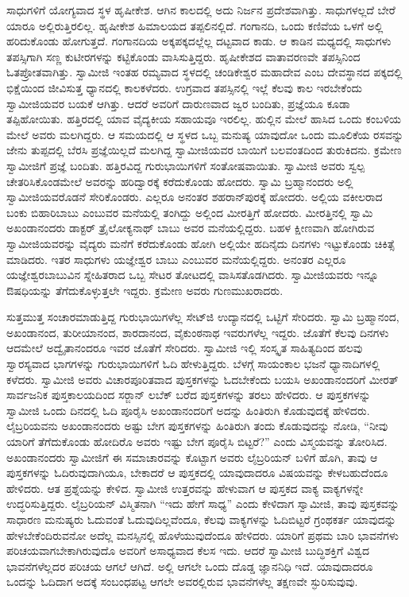 ಸಾಧುಗಳಿಗೆ ಯೋಗ್ಯವಾದ ಸ್ಥಳ ಹೃಷೀಕೇಶ. ಆಗಿನ ಕಾಲದಲ್ಲಿ ಅದು ನಿರ್ಜನ ಪ್ರದೇಶವಾಗಿತ್ತು. ಸಾಧುಗಳಲ್ಲದೆ ಬೇರೆ ಯಾರೂ ಅಲ್ಲಿರುತ್ತಿರಲಿಲ್ಲ. ಹೃಷೀಕೇಶ ಹಿಮಾಲಯದ ತಪ್ಪಲಿನಲ್ಲಿದೆ. ಗಂಗಾನದಿ, ಒಂದು ಕಣಿವೆಯ ಒಳಗೆ ಅಲ್ಲಿ ಹರಿದುಕೊಂಡು ಹೋಗುತ್ತದೆ. ಗಂಗಾನದಿಯ ಅಕ್ಕಪಕ್ಕದಲ್ಲೆಲ್ಲ ದಟ್ಟವಾದ ಕಾಡು. ಆ ಕಾಡಿನ ಮಧ್ಯದಲ್ಲಿ ಸಾಧುಗಳು ತಪಸ್ಸಿಗಾಗಿ ಸಣ್ಣ ಕುಟೀರಗಳನ್ನು ಕಟ್ಟಿಕೊಂಡು ವಾಸಿಸುತ್ತಿದ್ದರು. ಹೃಷೀಕೇಶದ ವಾತಾವರಣವೇ ತಪಸ್ಸಿನಿಂದ ಓತಪ್ರೋತವಾಗಿತ್ತು. ಸ್ವಾಮೀಜಿ ಇಂತಹ ರಮ್ಯವಾದ ಸ್ಥಳದಲ್ಲಿ ಚಂಡಿಕೇಶ್ವರ ಮಹಾದೇವ ಎಂಬ ದೇವಸ್ಥಾನದ ಪಕ್ಕದಲ್ಲಿ ಭಿಕ್ಷೆಯಿಂದ ಜೀವಿಸುತ್ತ ಧ್ಯಾನದಲ್ಲಿ ಕಾಲಕಳೆದರು. ಉಗ್ರವಾದ ತಪಸ್ಸಿನಲ್ಲಿ ಇಲ್ಲೆ ಕೆಲವು ಕಾಲ ಇರಬೇಕೆಂದು ಸ್ವಾಮೀಜಿಯವರ ಬಯಕೆ ಆಗಿತ್ತು. ಆದರೆ ಅವರಿಗೆ ದಾರುಣವಾದ ಜ್ವರ ಬಂದಿತು, ಪ್ರಜ್ಞೆಯೂ ಕೂಡಾ ತಪ್ಪಿಹೋಯಿತು. ಹತ್ತಿರದಲ್ಲಿ ಯಾವ ವೈದ್ಯಕೀಯ ಸಹಾಯವೂ ಇರಲಿಲ್ಲ. ಹುಲ್ಲಿನ ಮೇಲೆ ಹಾಸಿದ ಒಂದು ಕಂಬಳಿಯ ಮೇಲೆ ಅವರು ಮಲಗಿದ್ದರು. ಆ ಸಮಯದಲ್ಲಿ ಆ ಸ್ಥಳದ ಒಬ್ಬ ಮನುಷ್ಯ ಯಾವುದೋ ಒಂದು ಮೂಲಿಕೆಯ ರಸವನ್ನು ಜೇನು ತುಪ್ಪದಲ್ಲಿ ಬೆರಸಿ ಪ್ರಜ್ಞೆಯಿಲ್ಲದೆ ಮಲಗಿದ್ದ ಸ್ವಾಮೀಜಿಯವರ ಬಾಯಿಗೆ ಬಲವಂತದಿಂದ ತುರುಕಿದನು. ಕ್ರಮೇಣ ಸ್ವಾಮೀಜಿಗೆ ಪ್ರಜ್ಞೆ ಬಂದಿತು. ಹತ್ತಿರವಿದ್ದ ಗುರುಭಾಯಿಗಳಿಗೆ ಸಂತೋಷವಾಯಿತು. ಸ್ವಾಮೀಜಿ ಅವರು ಸ್ವಲ್ಪ ಚೇತರಿಸಿಕೊಂಡಮೇಲೆ ಅವರನ್ನು ಹರಿದ್ವಾರಕ್ಕೆ ಕರೆದುಕೊಂಡು ಹೋದರು. ಸ್ವಾಮಿ ಬ್ರಹ್ಮಾನಂದರು ಅಲ್ಲಿ ಸ್ವಾಮೀಜಿಯವರೊಡನೆ ಸೇರಿಕೊಂಡರು. ಎಲ್ಲರೂ ಅನಂತರ ಶಹರಾನ್‍ಪುರಕ್ಕೆ ಹೋದರು. ಅಲ್ಲಿಯ ವಕೀಲರಾದ ಬಂಕು ಬಿಹಾರಿಬಾಬು ಎಂಬುವರ ಮನೆಯಲ್ಲಿ ತಂಗಿದ್ದು ಅಲ್ಲಿಂದ ಮೀರತ್ತಿಗೆ ಹೋದರು. ಮೀರತ್ತಿನಲ್ಲಿ ಸ್ವಾಮಿ ಅಖಂಡಾನಂದರು ಡಾಕ್ಟರ್ ತ್ರೈಲೋಕ್ಯನಾಥ್ ಬಾಬು ಅವರ ಮನೆಯಲ್ಲಿದ್ದರು. ಬಹಳ ಕ್ಷೀಣವಾಗಿ ಹೋಗಿರುವ ಸ್ವಾಮೀಜಿಯವರನ್ನು ವೈದ್ಯರು ಮನೆಗೆ ಕರೆದುಕೊಂಡು ಹೋಗಿ ಅಲ್ಲಿಯೇ ಹದಿನೈದು ದಿನಗಳು ಇಟ್ಟುಕೊಂಡು ಚಿಕಿತ್ಸೆ ಮಾಡಿದರು. ಇತರ ಸಾಧುಗಳು ಯಜ್ಞೇಶ್ವರ ಬಾಬು ಎಂಬುವರ ಮನೆಯಲ್ಲಿದ್ದರು. ಅನಂತರ ಎಲ್ಲರೂ ಯಜ್ಞೇಶ್ವರಬಾಬುವಿನ ಸ್ನೇಹಿತರಾದ ಒಬ್ಬ ಸೇಟರ ತೋಟದಲ್ಲಿ ವಾಸಿಸತೊಡಗಿದರು. ಸ್ವಾಮೀಜಿಯವರು ಇನ್ನೂ ಔಷಧಿಯನ್ನು ತೆಗೆದುಕೊಳ್ಳುತ್ತಲೇ ಇದ್ದರು. ಕ್ರಮೇಣ ಅವರು ಗುಣಮುಖರಾದರು. 

ಸುತ್ತಮುತ್ತ ಸಂಚಾರಮಾಡುತ್ತಿದ್ದ ಗುರುಭಾಯಿಗಳೆಲ್ಲ ಸೇಟ್‍ಜಿ ಉದ್ಯಾನದಲ್ಲಿ ಒಟ್ಟಿಗೆ ಸೇರಿದರು. ಸ್ವಾಮಿ ಬ್ರಹ್ಮಾನಂದ, ಅಖಂಡಾನಂದ, ತುರೀಯಾನಂದ, ಶಾರದಾನಂದ, ವೈಕುಂಠನಾಥ ಇವರುಗಳೆಲ್ಲ ಇದ್ದರು. ಜೊತೆಗೆ ಕೆಲವು ದಿನಗಳು ಆದಮೇಲೆ ಅದ್ವೈತಾನಂದರೂ ಇವರ ಜೊತೆಗೆ ಸೇರಿದರು. ಸ್ವಾಮೀಜಿ ಇಲ್ಲಿ ಸಂಸ್ಕೃತ ಸಾಹಿತ್ಯದಿಂದ ಹಲವು ಸ್ವಾರಸ್ಯವಾದ ಭಾಗಗಳನ್ನು ಗುರುಭಾಯಿಗಳಿಗೆ ಓದಿ ಹೇಳುತ್ತಿದ್ದರು. ಬೆಳಗ್ಗೆ ಸಾಯಂಕಾಲ ಭಜನೆ ಧ್ಯಾನಾದಿಗಳಲ್ಲಿ ಕಳೆದರು. ಸ್ವಾಮೀಜಿ ಅವರು ವಿಚಾರಪೂರಿತವಾದ ಪುಸ್ತಕಗಳನ್ನು ಓದಬೇಕೆಂದು ಬಯಸಿ ಅಖಂಡಾನಂದರಿಗೆ ಮೀರತ್ ಸಾರ್ವಜನಿಕ ಪುಸ್ತಕಾಲಯದಿಂದ ಸರ್‍ಜಾನ್ ಲಬೆಕ್ ಬರೆದ ಪುಸ್ತಕಗಳನ್ನು ತರಲು ಹೇಳಿದರು. ಆ ಪುಸ್ತಕಗಳನ್ನು ಸ್ವಾಮೀಜಿ ಒಂದು ದಿನದಲ್ಲಿ ಓದಿ ಪೂರೈಸಿ ಅಖಂಡಾನಂದರಿಗೆ ಅದನ್ನು ಹಿಂತಿರುಗಿ ಕೊಡುವುದಕ್ಕೆ ಹೇಳಿದರು. ಲೈಬ್ರರಿಯವನು ಅಖಂಡಾನಂದರು ಅಷ್ಟು ಬೇಗ ಪುಸ್ತಕಗಳನ್ನು ಹಿಂತಿರುಗಿ ತಂದು ಕೊಡುವುದನ್ನು ನೋಡಿ, “ನೀವು ಯಾರಿಗೆ ತೆಗೆದುಕೊಂಡು ಹೋದಿರೊ ಅವರು ಇಷ್ಟು ಬೇಗ ಪೂರೈಸಿ ಬಿಟ್ಟರೆ?” ಎಂದು ವಿಸ್ಮಯವನ್ನು ತೋರಿಸಿದ. ಅಖಂಡಾನಂದರು ಸ್ವಾಮೀಜಿಗೆ ಈ ಸಮಾಚಾರವನ್ನು ಕೊಟ್ಟಾಗ ಅವರು ಲೈಬ್ರರಿಯನ್ ಬಳಿಗೆ ಹೊಗಿ, ತಾವು ಆ ಪುಸ್ತಕಗಳನ್ನು ಓದಿರುವುದಾಗಿಯೂ, ಬೇಕಾದರೆ ಆ ಪುಸ್ತಕದಲ್ಲಿ ಯಾವುದಾದರೂ ವಿಷಯವನ್ನು ಕೇಳಬಹುದೆಂದೂ ಹೇಳಿದರು. ಆತ ಪ್ರಶ್ನೆಯನ್ನು ಕೇಳಿದ. ಸ್ವಾಮೀಜಿ ಉತ್ತರವನ್ನು ಹೇಳುವಾಗ ಆ ಪುಸ್ತಕದ ವಾಕ್ಯ ವಾಕ್ಯಗಳನ್ನೇ ಉದ್ಧರಿಸುತ್ತಿದ್ದರು. ಲೈಬ್ರರಿಯನ್ ವಿಸ್ಮಿತನಾಗಿ “ಇದು ಹೇಗೆ ಸಾಧ್ಯ” ಎಂದು ಕೇಳಿದಾಗ ಸ್ವಾಮೀಜಿ, ತಾವು ಪುಸ್ತಕವನ್ನು ಸಾಧಾರಣ ಮನುಷ್ಯರು ಓದುವಂತೆ ಓದುವುದಿಲ್ಲವೆಂದೂ, ಕೆಲವು ವಾಕ್ಯಗಳನ್ನು ಓದಿಬಿಟ್ಟರೆ ಗ್ರಂಥಕರ್ತ ಯಾವುದನ್ನು ಹೇಳಬೇಕೆಂದಿರುವನೋ ಅದೆಲ್ಲ ಮನಸ್ಸಿನಲ್ಲಿ ಹೊಳೆಯುವುದೆಂದೂ ಹೇಳಿದರು. ಯಾರಿಗೆ ಪ್ರಥಮ ಬಾರಿ ಭಾವನೆಗಳು ಪರಿಚಯವಾಗಬೇಕಾಗಿರುವುದೊ ಅವರಿಗೆ ಅಸಾಧ್ಯವಾದ ಕೆಲಸ ಇದು. ಆದರೆ ಸ್ವಾಮೀಜಿ ಬುದ್ಧಿಶಕ್ತಿಗೆ ವಿಶ್ವದ ಭಾವನೆಗಳೆಲ್ಲದರ ಪರಿಚಯ ಆಗಲೆ ಆಗಿದೆ. ಅಲ್ಲಿ ಆಗಲೇ ಒಂದು ದೊಡ್ಡ ಜ್ಞಾನನಿಧಿ ಇದೆ. ಯಾವುದಾದರೂ ಒಂದನ್ನು ಓದಿದಾಗ ಅದಕ್ಕೆ ಸಂಬಂಧಪಟ್ಟ ಆಗಲೇ ಅವರಲ್ಲಿರುವ ಭಾವನೆಗಳೆಲ್ಲ ತಕ್ಷಣವೇ ಸ್ಫುರಿಸುವುವು. 

